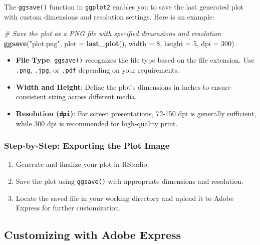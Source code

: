 \documentclass[
]{book}
\newenvironment{Shaded}{\begin{snugshade}}{\end{snugshade}}
\newcommand{\AttributeTok}[1]{\textcolor[rgb]{0.13,0.29,0.53}{#1}}
\newcommand{\CommentTok}[1]{\textcolor[rgb]{0.56,0.35,0.01}{\textit{#1}}}
\newcommand{\DecValTok}[1]{\textcolor[rgb]{0.00,0.00,0.81}{#1}}
\newcommand{\FunctionTok}[1]{\textcolor[rgb]{0.13,0.29,0.53}{\textbf{#1}}}
\newcommand{\NormalTok}[1]{#1}
\newcommand{\StringTok}[1]{\textcolor[rgb]{0.31,0.60,0.02}{#1}}
\providecommand{\tightlist}{%
  \setlength{\itemsep}{0pt}\setlength{\parskip}{0pt}}
\begin{document}
The \texttt{ggsave()} function in \texttt{ggplot2} enables you to save the last generated plot with custom dimensions and resolution settings. Here is an example:

\begin{Shaded}
\begin{Highlighting}[]
\CommentTok{\# Save the plot as a PNG file with specified dimensions and resolution}
\FunctionTok{ggsave}\NormalTok{(}\StringTok{"plot.png"}\NormalTok{, }\AttributeTok{plot =} \FunctionTok{last\_plot}\NormalTok{(), }\AttributeTok{width =} \DecValTok{8}\NormalTok{, }\AttributeTok{height =} \DecValTok{5}\NormalTok{, }\AttributeTok{dpi =} \DecValTok{300}\NormalTok{)}
\end{Highlighting}
\end{Shaded}

\begin{itemize}
\tightlist
\item
  \textbf{File Type}: \texttt{ggsave()} recognizes the file type based on the file extension. Use \texttt{.png}, \texttt{.jpg}, or \texttt{.pdf} depending on your requirements.
\item
  \textbf{Width and Height}: Define the plot's dimensions in inches to ensure consistent sizing across different media.
\item
  \textbf{Resolution (\texttt{dpi})}: For screen presentations, 72-150 dpi is generally sufficient, while 300 dpi is recommended for high-quality print.
\end{itemize}

\subsubsection*{Step-by-Step: Exporting the Plot Image}\label{step-by-step-exporting-the-plot-image}

\begin{enumerate}
\def\labelenumi{\arabic{enumi}.}
\tightlist
\item
  Generate and finalize your plot in RStudio.
\item
  Save the plot using \texttt{ggsave()} with appropriate dimensions and resolution.
\item
  Locate the saved file in your working directory and upload it to Adobe Express for further customization.
\end{enumerate}

\subsection*{Customizing with Adobe Express}\label{customizing-with-adobe-express}
\end{document}
